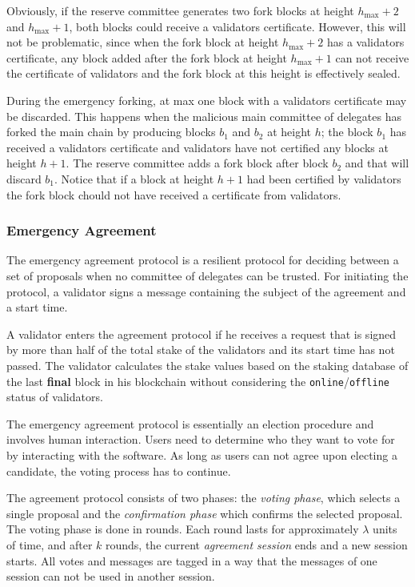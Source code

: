 Obviously, if the reserve committee generates two fork blocks at height $h_{\max} + 2$ and $h_{\max} + 1$, both blocks
could receive a validators certificate. However, this will not be problematic, since when the fork block at height
$h_{\max} + 2$ has a validators certificate, any block added after the fork block at height $h_{\max} + 1$ can not
receive the certificate of validators and the fork block at this height is effectively sealed.

During the emergency forking, at max one block with a validators certificate may be discarded. This happens when
the malicious main committee of delegates has forked the main chain by producing blocks $b_1$ and $b_2$ at height
$h$; the block $b_1$ has received a validators certificate and validators have not certified any blocks at height $h+1$.
The reserve committee adds a fork block after block $b_2$ and that will discard $b_1$. Notice that if a block at
height $h+1$ had been certified by validators the fork block chould not have received a certificate from validators.

\subsubsection{Emergency Agreement}

The emergency agreement protocol is a resilient protocol for deciding between a set of proposals when no committee of
delegates can be trusted. For initiating the protocol, a validator signs a message containing the subject
of the agreement and a start time.

A validator enters the agreement protocol if he
receives a request that is signed by more than half of the total stake
of the validators and its start time has not passed. The validator calculates
the stake values based on the staking database of the last \textbf{final} block in his blockchain without
considering the \texttt{online}/\texttt{offline} status of validators.

The emergency agreement protocol is essentially an election procedure and involves human interaction. Users need to
determine who they want to vote for by interacting with the software. As long as users can not agree upon electing a
candidate, the voting process has to continue.

The agreement protocol consists of two phases: the \emph{voting phase}, which selects a single proposal
and the \emph{confirmation phase} which confirms the selected proposal. The voting phase is done in rounds.
Each round lasts for approximately $\lambda$ units of time, and after $k$ rounds, the current \emph{agreement session}
ends and a new session starts. All votes and messages are tagged in a way that the messages of one session can
not be used in another session.

